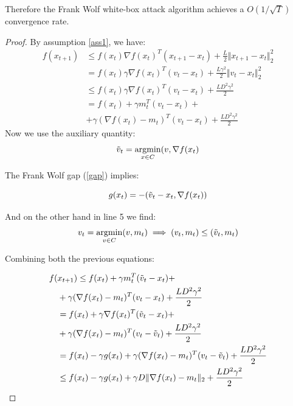 \documentclass[10pt,twocolumn,letterpaper, english]{article}
\newcommand{\argmin}{\mathop{\mathrm{argmin}}}
\theoremstyle{definition}
\theoremstyle{plain}
\theoremstyle{plain}
\theoremstyle{plain}
\theoremstyle{plain}
\theoremstyle{remark}
\theoremstyle{remark}
\theoremstyle{definition}
\theoremstyle{definition}
\theoremstyle{definition}
\theoremstyle{definition}
\begin{document}
Therefore the Frank Wolf white-box attack algorithm achieves a $O(1/\sqrt{T})$ convergence rate.

\begin{proof}

By assumption \ref{ass1}, we have:
\begin{align*}
    f(x_{t+1}) & \le f(x_t) \nabla f(x_t)^T ( x_{t+1} - x_t) + \frac{L}{2} \Vert x_{t+1} - x_t \Vert_{2}^2 \\
    &= f(x_t) \gamma \nabla f(x_t)^T ( v_t - x_t) + \frac{L \gamma^2}{2} \Vert v_t - x_t \Vert_{2}^2\\
    & \le f(x_t) \gamma \nabla f(x_t)^T ( v_t - x_t) + \frac{L D^2 \gamma^2}{2}\\
    &= f(x_t) + \gamma m_{t}^T ( v_t - x_t) +\\
    &+ \gamma(\nabla f(x_t) - m_t)^T (v_t - x_t) + \frac{L D^2 \gamma^2}{2} 
\end{align*}
Now we use the auxiliary quantity:
\begin{equation*}
    \Tilde{v}_t = \argmin_{x \in C} (v, \nabla f(x_t)
\end{equation*}

The Frank Wolf gap (\ref{gap}) implies:

\begin{equation*}
    g(x_t)= - ( \Tilde{v}_t -x_t, \nabla f(x_t))
\end{equation*}

And on the other hand in line 5 we find:
\begin{equation*}
    v_t= \argmin_{v \in C}(v,m_t) \implies (v_t,m_t) \le (\Tilde{v}_t, m_t)
\end{equation*}

Combining both the previous equations:

\begin{align*}
    f(& x_{t+1}) \le f(x_t) + \gamma m_{t}^T ( \Tilde{v}_t - x_t) +\\
    & + \gamma (\nabla f(x_t) - m_t)^T (v_t - x_t) + \frac{L D^2 \gamma^2}{2} \\
    & = f(x_t) + \gamma \nabla f(x_t)^T (\Tilde{v}_t - x_t) + \\
    &+ \gamma (\nabla f(x_t) - m_t)^T (v_t - \Tilde{v}_t) + \frac{L D^2 \gamma^2}{2}\\
    &= f(x_t) - \gamma g(x_t) + \gamma (\nabla f(x_t) - m_t)^T (v_t - \Tilde{v}_t) + \frac{L D^2 \gamma^2}{2} \\
    & \le  f(x_t) - \gamma g(x_t) + \gamma D \Vert \nabla f(x_t) - m_t \Vert_2 + \frac{L D^2 \gamma^2}{2}
\end{align*}


\end{proof}
\end{document}
